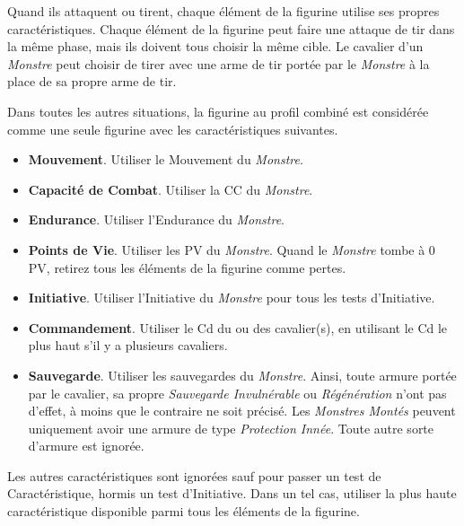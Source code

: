 Quand ils attaquent ou tirent, chaque élément de la figurine utilise ses propres caractéristiques. Chaque élément de la figurine peut faire une attaque de tir dans la même phase, mais ils doivent tous choisir la même cible. Le cavalier d'un \emph{Monstre} peut choisir de tirer avec une arme de tir portée par le \emph{Monstre} à la place de sa propre arme de tir.

Dans toutes les autres situations, la figurine au profil combiné est considérée comme une seule figurine avec les caractéristiques suivantes. 


\begin{itemize}[label={-}]
\item \textbf{Mouvement}. Utiliser le Mouvement du \emph{Monstre}.
\item \textbf{Capacité de Combat}. Utiliser la CC du \emph{Monstre}.
\item \textbf{Endurance}. Utiliser l'Endurance du \emph{Monstre}.
\item \textbf{Points de Vie}. Utiliser les PV du \emph{Monstre}. Quand le \emph{Monstre} tombe à 0 PV, retirez tous les éléments de la figurine comme pertes.
\item \textbf{Initiative}. Utiliser l'Initiative du \emph{Monstre} pour tous les tests d'Initiative.
\item \textbf{Commandement}. Utiliser le Cd du ou des cavalier(s), en utilisant le Cd le plus haut s'il y a plusieurs cavaliers.
\item \textbf{Sauvegarde}. Utiliser les sauvegardes du \emph{Monstre}. Ainsi, toute armure portée par le cavalier, sa propre \emph{Sauvegarde Invulnérable} ou \emph{Régénération} n'ont pas d'effet, à moins que le contraire ne soit précisé. Les \emph{Monstres Montés} peuvent uniquement avoir une armure de type \emph{Protection Innée}. Toute autre sorte d'armure est ignorée.
\end{itemize}

Les autres caractéristiques sont ignorées sauf pour passer un test de Caractéristique, hormis un test d'Initiative. Dans un tel cas, utiliser la plus haute caractéristique disponible parmi tous les éléments de la figurine.

\subsubsection*{}

